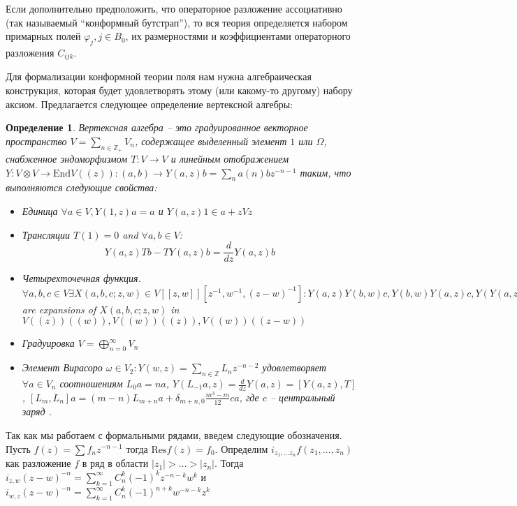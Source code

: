 \documentclass[12pt]{article}
\newtheorem{Def}{Определение}[section]
\begin{document}
Если дополнительно предположить, что операторное разложение ассоциативно (так называемый
``конформный бутстрап''), то вся теория определяется набором примарных полей $\varphi_{j}, j\in
B_{0}$, их размерностями и коэффициентами операторного разложения $C_{ijk}$.

Для формализации конформной теории поля нам нужна алгебраическая конструкция, которая будет
удовлетворять этому (или какому-то другому) набору аксиом. Предлагается следующее определение
вертексной алгебры:

\begin{Def}
  Вертексная алгебра -- это градуированное векторное пространство
  $V=\sum_{n\in \mathbb{Z}_{+}} V_{n}$, содержащее выделенный элемент
  $1$ или  $\Omega$, снабженное эндоморфизмом $T:V\to V$ и линейным отображением
  $Y:V\otimes V\to \mathrm{End}V((z)): (a,b)\to Y(a,z)b=\sum_n a (n) b
  z^{-n-1}$ таким, что выполняются следующие свойства:
  \begin{itemize}
  \item {\it Единица} $\forall a\in V, Y(1,z) a =a$ и $Y(a,z) 1 \in a+z V z$
  \item {\it Трансляции} $T(1)=0$ and $\forall a,b\in V$:
    $$Y(a,z)T b - T Y(a,z) b =
    \frac{d}{dz} Y(a,z) b$$
  \item {\it Четырехточечная функция}. $\forall a,b,c\in V \exists
    X(a,b,c;z,w)\in V[[z,w]][z^{-1},w^{-1},(z-w)^{-1}]: Y(a,z)Y(b,w)c,
    Y(b,w)Y(a,z)c, Y(Y(a,z-w)b,w)c$ are expansions of $X(a,b,c;z,w)$
    in $V((z))((w)), V((w))((z)), V((w))((z-w))$
  \item {\it Градуировка} $V=\bigoplus_{n=0}^{\infty} V_n$
  \item {\it Элемент Вирасоро} $\omega\in V_2: Y(w,z)=\sum_{n\in
      \mathbb{Z}} L_n z^{-n-2}$ удовлетворяет $\forall a\in V_n$
    соотношениям $L_0 a =n a$,
    $Y(L_{-1}a,z)=\frac{d}{dz}Y(a,z)=[Y(a,z),T]$,
    $[L_m,L_n]a=(m-n)L_{m+n} a + \delta_{m+n,0} \frac{m^3 - m}{12}ca$,
    где $c$ -- центральный заряд .
  \end{itemize}

\end{Def}


Так как мы работаем с формальными рядами, введем следующие обозначения.
Пусть $f(z)=\sum f_n z^{-n-1}$ тогда $\mathrm{Res} f(z)= f_0$. Определим $i_{z_1,\dots z_n}
f(z_1,\dots,z_n)$ как разложение $f$ в ряд в области $|z_1|>\dots>|z_n|$. 
Тогда $i_{z,w}(z-w)^{-n} = \sum_{k=1}^{\infty} C_n^k (-1)^k z^{-n-k} w^k$ и $i_{w,z}(z-w)^{-n} = \sum_{k=1}^{\infty} C_n^k (-1)^{n+k} w^{-n-k} z^{k} $ 
\end{document}
